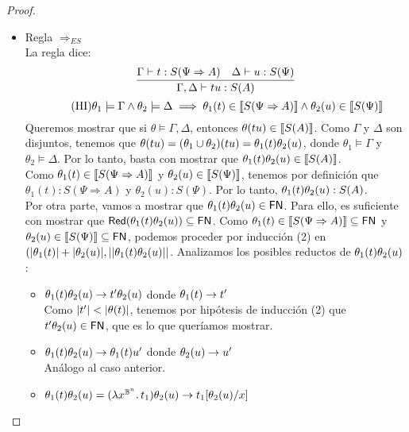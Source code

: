 \begin{proof}
\begin{itemize}
    \item Regla \( \Rightarrow_{ES} \)
    \\ La regla dice:
    \[ \infer{\Gamma, \Delta \vdash t u : S(A)}{\Gamma \vdash t : S(\Psi \Rightarrow A) & \Delta \vdash u : S(\Psi)} \]
    \[
      \tag{HI}
      \theta_1 \models \Gamma \land \theta_2 \models \Delta
      \implies \theta_1(t) \in \llbracket S(\Psi \Rightarrow A)\rrbracket
      \land \theta_2(u) \in \llbracket S(\Psi)\rrbracket
    \]
    Queremos mostrar que si \( \theta \models \Gamma, \Delta \), entonces \( \theta(t u) \in \llbracket S(A)\rrbracket \).
    Como \( \Gamma \) y \( \Delta \) son disjuntos, tenemos que \( \theta(t u) = (\theta_1 \cup \theta_2)(t u) = \theta_1(t) \theta_2(u) \), donde \( \theta_1 \models \Gamma \) y \( \theta_2 \models \Delta \).
    Por lo tanto, basta con mostrar que \( \theta_1(t) \theta_2(u) \in \llbracket S(A)\rrbracket \).
    \\ Como \( \theta_1(t) \in \llbracket S(\Psi \Rightarrow A)\rrbracket \) y \( \theta_2(u) \in \llbracket S(\Psi)\rrbracket \), tenemos por definición que \( \theta_1(t) : S(\Psi \Rightarrow A) \) y \( \theta_2(u) : S(\Psi) \). Por lo tanto, \( \theta_1(t) \theta_2(u) : S(A) \).
    \\ Por otra parte, vamos a mostrar que \( \theta_1(t) \theta_2(u) \in \mathsf{FN} \). Para ello, es suficiente con mostrar que \( \mathsf{Red} (\theta_1(t) \theta_2(u)) \subseteq \mathsf{FN} \). Como \( \theta_1(t) \in \llbracket S(\Psi \Rightarrow A)\rrbracket \subseteq \mathsf{FN} \) y \( \theta_2(u) \in \llbracket S(\Psi)\rrbracket \subseteq \mathsf{FN} \), podemos proceder por inducción (2) en \( (|\theta_1(t)| + |\theta_2(u)|, ||\theta_1(t) \theta_2(u)|| \). Analizamos los posibles reductos de \( \theta_1(t) \theta_2(u) \):
    \begin{itemize}
      \item \( \theta_1(t) \theta_2(u) \rightarrow t' \theta_2(u) \) donde \( \theta_1(t) \rightarrow t' \)
      \\ Como \( |t'| < |\theta(t)| \), tenemos por hipótesis de inducción (2) que \( t' \theta_2(u) \in \mathsf{FN} \), que es lo que queríamos mostrar.
      \item \( \theta_1(t) \theta_2(u) \rightarrow \theta_1(t) u' \) donde \( \theta_2(u) \rightarrow u' \)
      \\ Análogo al caso anterior.
      \item \( \theta_1(t) \theta_2(u) = (\lambda x^{\mathbb{B}^n}\ldotp t_1) \theta_2(u) \rightarrow t_1[\theta_2(u)/x] \)

\end{itemize}
\end{itemize}
\end{proof}
